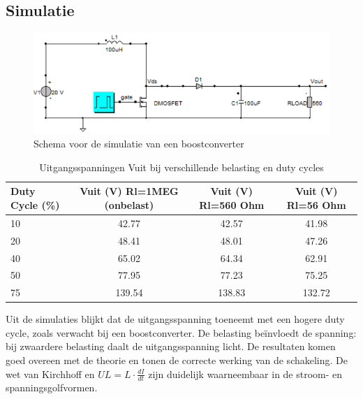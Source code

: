 \subsection{Simulatie}
\begin{figure}[h!]
    \centering
    \includegraphics[width=1\linewidth]{img/hfd1/Schema voor de simulatie van een boostconverter.png}
    \caption{Schema voor de simulatie van een boostconverter}
    \label{fig:Schema voor de simulatie van een boostconverter}
\end{figure}
\begin{table}[h!]
\centering
\begin{tabular}{|l|c|c|c|}
\hline
\textbf{Duty Cycle (\%)} & \textbf{Vuit (V) Rl=1MEG (onbelast)} & \textbf{Vuit (V) Rl=560 Ohm} & \textbf{Vuit (V) Rl=56 Ohm} \\ \hline
10 & 42.77 & 42.57 & 41.98 \\ \hline
20 & 48.41 & 48.01 & 47.26 \\ \hline
40 & 65.02 & 64.34 & 62.91 \\ \hline
50 & 77.95 & 77.23 & 75.25 \\ \hline
75 & 139.54 & 138.83 & 132.72 \\ \hline
\end{tabular}
\caption{Uitgangsspanningen Vuit bij verschillende belasting en duty cycles}
\end{table}
Uit de simulaties blijkt dat de uitgangsspanning toeneemt met een hogere duty cycle, zoals verwacht bij een boostconverter. De belasting beïnvloedt de spanning: bij zwaardere belasting daalt de uitgangsspanning licht. De resultaten komen goed overeen met de theorie en tonen de correcte werking van de schakeling. De wet van Kirchhoff en \(UL = L \cdot \frac{dI}{dt}\) zijn duidelijk waarneembaar in de stroom- en spanningsgolfvormen.

